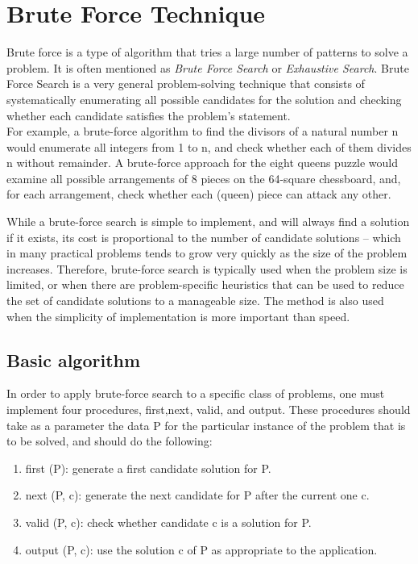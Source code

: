 \documentclass{report}
\begin{document}
\section{Brute Force Technique}
Brute force is a type of algorithm that tries a large number of patterns to solve a problem. It is often mentioned as \textit{Brute Force Search} or \textit{Exhaustive Search}. Brute Force Search is a very general problem-solving technique that consists of systematically enumerating all possible candidates for the solution and checking whether each candidate satisfies the problem's statement.\\
For example, a brute-force algorithm to find the divisors of a natural number n would enumerate all integers from 1 to n, and check whether each of them divides n without remainder. A brute-force approach for the eight queens puzzle would examine all possible arrangements of 8 pieces on the 64-square chessboard, and, for each arrangement, check whether each (queen) piece can attack any other.

\bigskip
While a brute-force search is simple to implement, and will always find a solution if it exists, its cost is proportional to the number of candidate solutions – which in many practical problems tends to grow very quickly as the size of the problem increases. Therefore, brute-force search is typically used when the problem size is limited, or when there are problem-specific heuristics that can be used to reduce the set of candidate solutions to a manageable size. The method is also used when the simplicity of implementation is more important than speed.

\subsection*{Basic algorithm}
In order to apply brute-force search to a specific class of problems, one must implement four procedures, first,next, valid, and output. These procedures should take as a parameter the data P for the particular instance of the problem that is to be solved, and should do the following:

\begin{enumerate}
    \item first (P): generate a first candidate solution for P.
    \item next (P, c): generate the next candidate for P after the current one c.
    \item valid (P, c): check whether candidate c is a solution for P.
    \item output (P, c): use the solution c of P as appropriate to the application.
\end{enumerate}
\end{document}
